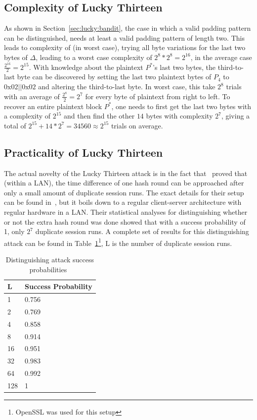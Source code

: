 \documentclass[10pt,conference,a4paper]{IEEEtran}
\begin{document}
\subsection{Complexity of Lucky Thirteen}
\label{sec:lucky:complexity}
As shown in Section~\ref{sec:lucky:bandit}, the case in which a valid padding pattern can be distinguished, needs at least a valid padding pattern of length two. This leads to complexity of (in worst case), trying all byte variations for the last two bytes of $\Delta$, leading to a worst case complexity of $2^8*2^8 = 2^{16}$, in the average case $\frac{2^{16}}{2} = 2^{15}$. With knowledge about the plaintext $P^{*}$'s last two bytes, the third-to-last byte can be discovered by setting the last two plaintext bytes of $P_4$ to $0\text{x}02||0\text{x}02$ and altering the third-to-last byte. In worst case, this take $2^8$ trials with an average of $\frac{2^8}{2} = 2^7$ for every byte of plaintext from right to left. To recover an entire plaintext block $P^{*}$, one needs to first get the last two bytes with a complexity of $2^{15}$ and then find the other $14$ bytes with complexity $2^7$, giving a total of $2^{15} + 14 * 2^7 = 34560 \approx 2^{15}$ trials on average.

\subsection{Practicality of Lucky Thirteen}
\label{sec:lucky:practicality}
The actual novelty of the Lucky Thirteen attack is in the fact that~\citeauthor{alfardan2013lucky} proved that (within a LAN), the time difference of one hash round can be approached after only a small amount of duplicate session runs. The exact details for their setup can be found in~\cite{alfardan2013lucky}, but it boils down to a regular client-server architecture with regular hardware in a LAN. Their statistical analyses for distinguishing whether or not the extra hash round was done showed that with a success probability of 1, only $2^7$ duplicate session runs. A complete set of results for this distinguishing attack can be found in Table~\ref{sec:lucky:practicality:distinguishtable}\footnote{OpenSSL was used for this setup}, L is the number of duplicate session runs.

\begin{table}[h]
    \begin{tabular}{|l|l|}
    \hline
    L & Success Probability \\ \hline \hline
    1 & 0.756  \\ \hline
    2 & 0.769  \\ \hline
    4 & 0.858  \\ \hline
    8 & 0.914  \\ \hline
    16 & 0.951  \\ \hline
    32 & 0.983  \\ \hline
    64 & 0.992  \\ \hline
    128 & 1 \\ \hline
    \end{tabular}
    \caption{Distinguishing attack success probabilities~\cite{alfardan2013lucky}}
    \label{sec:lucky:practicality:distinguishtable}
\end{table}
\end{document}

